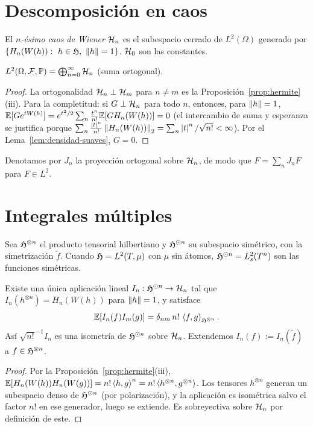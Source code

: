 \section{Descomposición en caos}

\begin{definicion}
El \emph{$n$-ésimo caos de Wiener} $\mathcal{H}_n$ es el subespacio cerrado de $L^2(\Omega)$ generado
por $\{H_n(W(h)):\ h\in\Hf,\ \norm{h}=1\}$. $\mathcal{H}_0$ son las constantes.
\end{definicion}

\begin{teorema}\label{teo:caos}
$L^2(\Omega,\mathcal{F},\mathbb{P})=\bigoplus_{n=0}^\infty\mathcal{H}_n$ \textup{(}suma ortogonal\textup{)}.
\end{teorema}

\begin{proof}
La ortogonalidad $\mathcal{H}_n\perp\mathcal{H}_m$ para $n\ne m$ es la Proposición~\ref{prop:hermite}(iii).
Para la completitud: si $G\perp\mathcal{H}_n$ para todo $n$, entonces, para $\left\lVert h\right\rVert=1$, $\mathbb{E}[Ge^{tW(h)}]=
e^{t^2/2}\sum_n\frac{t^n}{n!}\mathbb{E}[GH_n(W(h))]=0$ (el intercambio de suma y esperanza se justifica porque
$\sum_n\frac{\left\lvert t\right\rvert^n}{n!}\left\lVert H_n(W(h))\right\rVert_2=\sum_n\left\lvert t\right\rvert^n/\sqrt{n!}<\infty$). Por el Lema~\ref{lem:densidad-suaves}, $G=0$.
\end{proof}

Denotamos por $J_n$ la proyección ortogonal sobre $\mathcal{H}_n$, de modo que $F=\sum_nJ_nF$ para
$F\in L^2$.

\section{Integrales múltiples}
Sea $\mathfrak{H}^{\otimes n}$ el producto tensorial hilbertiano y $\mathfrak{H}^{\odot n}$ su subespacio simétrico, con la simetrización
$\tilde f$. Cuando $\mathfrak{H}=L^2(T,\mu)$ con $\mu$ sin átomos, $\mathfrak{H}^{\odot n}=L^2_s(T^n)$ son las funciones simétricas.

\begin{proposicion}\label{prop:integrales-multiples}
Existe una única aplicación lineal $I_n:\mathfrak{H}^{\odot n}\to\mathcal{H}_n$ tal que $I_n(h^{\otimes n})=
H_n(W(h))$ para $\left\lVert h\right\rVert=1$, y satisface
\[
  \mathbb{E}[I_n(f)I_m(g)]=\delta_{nm}\,n!\,\left\langle f, g\right\rangle_{\mathfrak{H}^{\otimes n}}.
\]
Así $\sqrt{n!}^{-1}I_n$ es una isometría de $\mathfrak{H}^{\odot n}$ sobre $\mathcal{H}_n$. Extendemos $I_n(f):=I_n(\tilde f)$ a $f\in\mathfrak{H}^{\otimes n}$.
\end{proposicion}

\begin{proof}
Por la Proposición~\ref{prop:hermite}(iii), $\mathbb{E}[H_n(W(h))H_n(W(g))]=n!\left\langle h, g\right\rangle^n=n!\left\langle h^{\otimes n}, g^{\otimes n}\right\rangle$.
Los tensores $h^{\otimes n}$ generan un subespacio denso de $\mathfrak{H}^{\odot n}$ (por polarización), y la aplicación es
isométrica salvo el factor $n!$ en ese generador, luego se extiende. Es sobreyectiva sobre $\mathcal{H}_n$ por
definición de este.
\end{proof}

